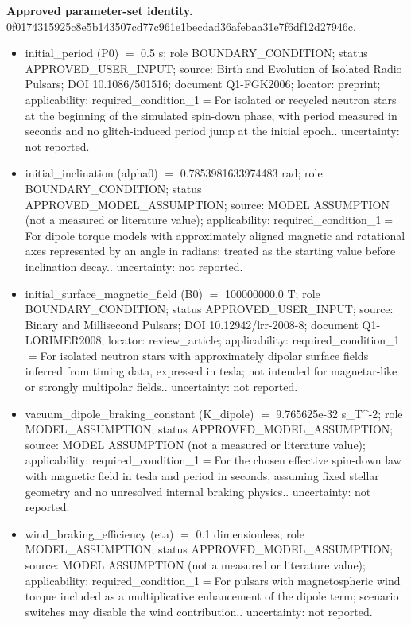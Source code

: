 \documentclass[11pt]{article}
\begin{document}
\noindent\textbf{Approved parameter-set identity.} 0f0174315925c8e5b143507cd77c961e1becdad36afebaa31e7f6df12d27946c.
\begin{itemize}
\item initial\_period (P0) \ensuremath{=} 0.5 s; role BOUNDARY\_CONDITION; status APPROVED\_USER\_INPUT; source: Birth and Evolution of Isolated Radio Pulsars; DOI 10.1086/501516; document Q1-FGK2006; locator: preprint; applicability: required\_condition\_1\ensuremath{=}For isolated or recycled neutron stars at the beginning of the simulated spin-down phase, with period measured in seconds and no glitch-induced period jump at the initial epoch.. uncertainty: not reported.
\item initial\_inclination (alpha0) \ensuremath{=} 0.7853981633974483 rad; role BOUNDARY\_CONDITION; status APPROVED\_MODEL\_ASSUMPTION; source: MODEL ASSUMPTION (not a measured or literature value); applicability: required\_condition\_1\ensuremath{=}For dipole torque models with approximately aligned magnetic and rotational axes represented by an angle in radians; treated as the starting value before inclination decay.. uncertainty: not reported.
\item initial\_surface\_magnetic\_field (B0) \ensuremath{=} 100000000.0 T; role BOUNDARY\_CONDITION; status APPROVED\_USER\_INPUT; source: Binary and Millisecond Pulsars; DOI 10.12942/lrr-2008-8; document Q1-LORIMER2008; locator: review\_article; applicability: required\_condition\_1\ensuremath{=}For isolated neutron stars with approximately dipolar surface fields inferred from timing data, expressed in tesla; not intended for magnetar-like or strongly multipolar fields.. uncertainty: not reported.
\item vacuum\_dipole\_braking\_constant (K\_dipole) \ensuremath{=} 9.765625e-32 s\_T\textasciicircum{}-2; role MODEL\_ASSUMPTION; status APPROVED\_MODEL\_ASSUMPTION; source: MODEL ASSUMPTION (not a measured or literature value); applicability: required\_condition\_1\ensuremath{=}For the chosen effective spin-down law with magnetic field in tesla and period in seconds, assuming fixed stellar geometry and no unresolved internal braking physics.. uncertainty: not reported.
\item wind\_braking\_efficiency (eta) \ensuremath{=} 0.1 dimensionless; role MODEL\_ASSUMPTION; status APPROVED\_MODEL\_ASSUMPTION; source: MODEL ASSUMPTION (not a measured or literature value); applicability: required\_condition\_1\ensuremath{=}For pulsars with magnetospheric wind torque included as a multiplicative enhancement of the dipole term; scenario switches may disable the wind contribution.. uncertainty: not reported.

\end{itemize}
\end{document}
